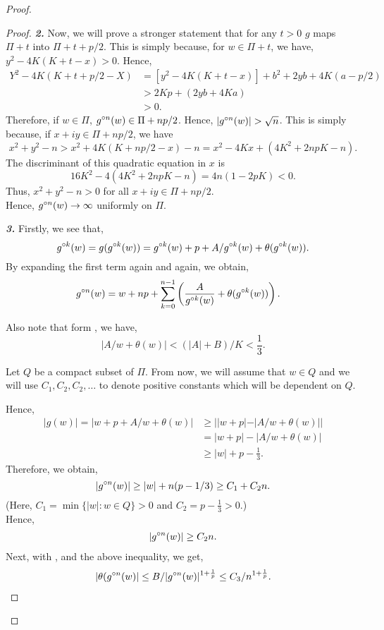 \begin{proof}
\begin{proof}
	\noindent \textbf{\emph{2.}} Now, we will prove a stronger statement that for any \( t>0 \)
	\( g \) maps \( \Pi+t \) into \( \Pi+t+p /2 \). This is simply because, for \( w\in\Pi+t \),
	we have, \( y^2-4K(K+t-x)>0 \). Hence,
	\begin{align*}
		Y^2-4K(K+t+p /2-X)&=[y^2-4K(K+t-x)]+b^2+2yb+4K(a-p /2)\\
		&> 2Kp+(2yb+4Ka)\\
		&>0
	.\end{align*}
	Therefore, if \( w\in\Pi \), \( \gog[n](w)\in \Pi+np /2 \). Hence, \( |\gog[n](w)|>\sqrt{n}  \).
	This is simply because, if \( x+iy\in \Pi+np /2 \), we have \[ x^2+y^2-n>x^2+4K(K+np /2-x)-n=x^2-4Kx+(4K^2+2npK-n). \] The discriminant of this quadratic equation in \( x \) is \[ 16K^2-4(4K^2+2npK-n)=4n(1-2pK)<0 .\] Thus, \( x^2+y^2-n>0 \) for all \( x+iy\in \Pi+np /2 \).\\
Hence, \( \gog[n](w)\to \infty \) uniformly on \( \Pi \).\\
\vspace{1pt}

\noindent \textbf{\emph{3.}} Firstly, we see that, \[
	\gog[k](w)=g(\gog[k](w))=\gog[k](w)+p+A /\gog[k](w)+\theta (\gog[k](w))
.\] 
By expanding the first term again and again, we obtain,
\begin{align}
	\gog[n](w)&=w+np+ \sum_{k=0}^{n-1} \left(\frac{A}{\gog[k](w)}  +\theta(\gog[k](w))\right) \label{eqn3.4}
.\end{align}

Also note that form , we have, \[
	|A /w+\theta (w)|<(|A|+B) /K <\frac{1}{3}
.\] 

Let \( Q \) be a compact subset of \( \Pi \). From now, we will assume that \( w\in Q \) and we will use
\( C_1,C_2,C_2,\ldots  \) to denote positive constants which will be dependent on \( Q \).

Hence,
\begin{align*}
|g(w)|=|w+p+A /w+\theta (w)|&\ge ||w+p|-|A /w+\theta (w)| |\\
								&= |w+p|-|A /w+\theta (w)|\\
								&\ge |w|+p-\frac{1}{3}
.\end{align*}
Therefore, we obtain, \[
	|\gog[n](w)|\ge |w|+n(p-1 /3)\ge C_1+C_2n
.\] 
(Here, \( C_1=\min\{|w|:w\in Q\}>0 \) and \( C_2=p-\frac{1}{3}>0 \).)\\
Hence,
\begin{align}
	|\gog[n](w)|\ge C_2 n\label{eqn3.5}.
\end{align}
Next, with , and the above inequality, we get,
\begin{align}
	|\theta (\gog[n](w)|\le B /|\gog[n](w)|^{1+\frac{1}{p}}\le C_3 /n^{1+\frac{1}{p}}\label{eqn3.6}
.\end{align}


\end{proof}
\end{proof}
